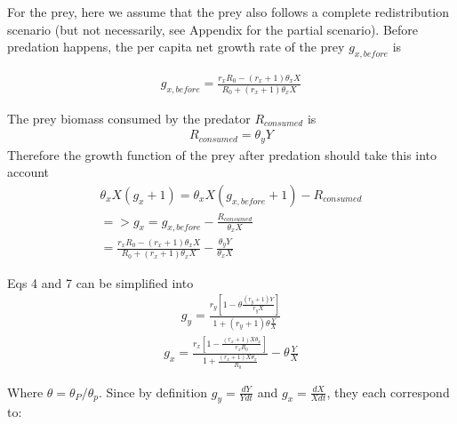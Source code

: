 \documentclass[12pt]{article}
\begin{document}
For the prey, here we assume that the prey also follows a complete redistribution scenario (but not necessarily, see Appendix for the partial scenario). Before predation happens, the per capita net growth rate of the prey $g_{x,before}$ is 

  \begin{equation}
 \begin{split}
g_{x, before} =  \frac{r_x R_0 - (r_x+1) \theta_x X}{R_0 + (r_x+1) \theta_x X} 
\end{split}
\end{equation}

The prey biomass consumed by the predator $R_{consumed}$ is 
 \begin{equation}
 \begin{split}
R_{consumed}  = \theta_y Y
\end{split}
\end{equation}
Therefore the growth function of the prey after predation should take this into account
 \begin{equation}
 \begin{split}
\theta_x X (g_{x} +1) =\theta_x X (g_{x, before} +1) - R_{consumed}  \\
=> g_{x} = g_{x, before} - \frac{R_{consumed}}{\theta_x X} \\
= \frac{r_x R_0 - (r_x+1) \theta_x X}{R_0 + (r_x+1) \theta_x X} - \frac{\theta_y Y}{\theta_x X}
\end{split}
\end{equation}

Eqs 4 and 7 can be simplified into
 \begin{equation}
 \begin{split}
g_y = \frac{r_{y}  [ 1 -  \theta  \frac{(r_{y} +1)Y}{r_y X} ]}{ 1+ (r_{y}+1) \theta \frac{Y}{X}} 
\end{split}
\end{equation}
 \begin{equation}
 \begin{split}
g_x = \frac{r_{x}  [1 -\frac{(r_{x} +1)X\theta_x}{r_x R_0 }]}{ 1 +  \frac{(r_{x} +1)X\theta_x}{R_0}}   -  \theta\frac{Y}{X} 
\end{split}
\end{equation}

Where $\theta = \theta_P/\theta_p$. Since by definition $g_y = \frac{d Y}{Y d t} $ and $g_x = \frac{d X}{X d t} $, they each correspond to:
\end{document}
